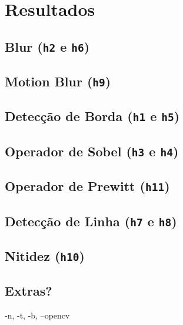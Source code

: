 \section{Resultados}

\subsection{Blur (\texttt{h2} e \texttt{h6})} \label{sec:blur}

    

\subsection{Motion Blur (\texttt{h9})} \label{sec:motion}

    

\subsection{Detecção de Borda (\texttt{h1} e \texttt{h5})} \label{sec:borda}

    

\subsection{Operador de Sobel (\texttt{h3} e \texttt{h4})} \label{sec:sobel}

    

\subsection{Operador de Prewitt (\texttt{h11})} \label{sec:grad}

    

\subsection{Detecção de Linha (\texttt{h7} e \texttt{h8})} \label{sec:linha}

    

\subsection{Nitidez (\texttt{h10})} \label{sec:sharpen}

    

\subsection{Extras?}

    -n, -t, -b, --opencv
